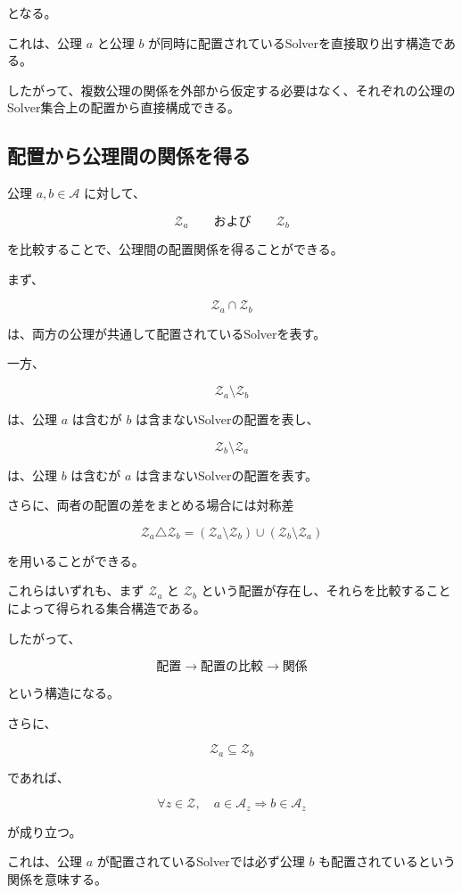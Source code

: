 となる。

これは、公理 $a$ と公理 $b$ が同時に配置されているSolverを直接取り出す構造である。

したがって、複数公理の関係を外部から仮定する必要はなく、それぞれの公理のSolver集合上の配置から直接構成できる。

\subsection{配置から公理間の関係を得る}

公理 $a,b\in\mathcal{A}$ に対して、

\[
\mathcal{Z}_a
\qquad\text{および}\qquad
\mathcal{Z}_b
\]

を比較することで、公理間の配置関係を得ることができる。

まず、

\[
\mathcal{Z}_a\cap\mathcal{Z}_b
\]

は、両方の公理が共通して配置されているSolverを表す。

一方、

\[
\mathcal{Z}_a\setminus\mathcal{Z}_b
\]

は、公理 $a$ は含むが $b$ は含まないSolverの配置を表し、

\[
\mathcal{Z}_b\setminus\mathcal{Z}_a
\]

は、公理 $b$ は含むが $a$ は含まないSolverの配置を表す。

さらに、両者の配置の差をまとめる場合には対称差

\[
\boxed{
\mathcal{Z}_a\triangle\mathcal{Z}_b = (\mathcal{Z}_a\setminus\mathcal{Z}_b) \cup (\mathcal{Z}_b\setminus\mathcal{Z}_a)
}
\]

を用いることができる。

これらはいずれも、まず $\mathcal{Z}_a$ と $\mathcal{Z}_b$ という配置が存在し、それらを比較することによって得られる集合構造である。

したがって、

\[
\boxed{
\text{配置}
\longrightarrow
\text{配置の比較}
\longrightarrow
\text{関係}
}
\]

という構造になる。

さらに、

\[
\mathcal{Z}_a\subseteq\mathcal{Z}_b
\]

であれば、

\[
\forall z\in\mathcal{Z},
\quad
a\in\mathcal{A}_z
\Longrightarrow
b\in\mathcal{A}_z
\]

が成り立つ。

これは、公理 $a$ が配置されているSolverでは必ず公理 $b$ も配置されているという関係を意味する。

